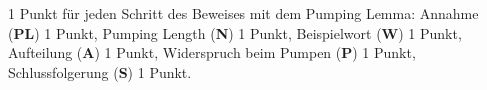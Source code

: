 \begin{bewertung} 1 Punkt für jeden Schritt des Beweises mit dem
Pumping Lemma:
Annahme ({\bf PL}) 1 Punkt,
Pumping Length ({\bf N}) 1 Punkt,
Beispielwort ({\bf W}) 1 Punkt,
Aufteilung ({\bf A}) 1 Punkt,
Widerspruch beim Pumpen ({\bf P}) 1 Punkt,
Schlussfolgerung ({\bf S}) 1 Punkt.
\end{bewertung}
